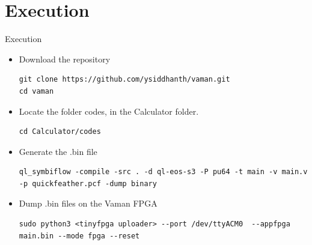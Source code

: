 \documentclass{beamer}
\theoremstyle{remark}
\begin{document}
\section{Execution}
\begin{frame}[fragile]{Execution}
\begin{itemize}
    \item Download the repository
    \begin{verbatim}
git clone https://github.com/ysiddhanth/vaman.git
cd vaman
\end{verbatim}

    \item Locate the folder codes, in the Calculator folder.
    \begin{verbatim}
cd Calculator/codes
\end{verbatim}

    \item Generate the .bin file
    \begin{verbatim}
ql_symbiflow -compile -src . -d ql-eos-s3 -P pu64 -t main -v main.v -p quickfeather.pcf -dump binary
\end{verbatim}

    \item Dump .bin files on the Vaman FPGA
    \begin{verbatim}
sudo python3 <tinyfpga uploader> --port /dev/ttyACM0  --appfpga main.bin --mode fpga --reset
\end{verbatim}
\end{itemize}
\end{frame}
\end{document}
